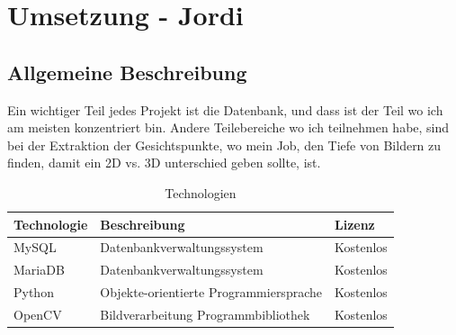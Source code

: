 \chapter{Umsetzung - Jordi}
\label{\docname}

\section{Allgemeine Beschreibung}
Ein wichtiger Teil jedes Projekt ist die Datenbank, und dass ist der Teil wo ich am meisten konzentriert bin. Andere Teilebereiche wo ich teilnehmen habe, sind bei der Extraktion der Gesichtspunkte, wo mein Job, den Tiefe von Bildern zu finden, damit ein 2D vs. 3D unterschied geben sollte, ist.

\begin{table}[ht]
	\centering
	\begin{tabular}{ |l|l|l| } 
		\hline		
		Technologie & Beschreibung & Lizenz \\ 
		\hline
		MySQL & Datenbankverwaltungssystem & Kostenlos \\ 
		\hline
		MariaDB & Datenbankverwaltungssystem & Kostenlos \\
		\hline 
		Python & Objekte-orientierte Programmiersprache & Kostenlos \\
		\hline 
		OpenCV &  Bildverarbeitung Programmbibliothek  & Kostenlos \\ 
		\hline
	\end{tabular}
	\caption{Technologien}
	\label{table:tech}
\end{table}
